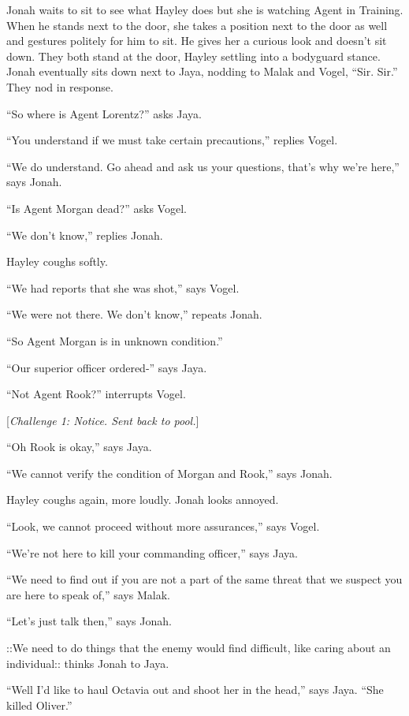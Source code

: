 Jonah waits to sit to see what Hayley does but she is watching Agent in Training.  When he stands next to the door, she takes a position next to the door as well and gestures politely for him to sit.  He gives her a curious look and doesn't sit down.  They both stand at the door, Hayley settling into a bodyguard stance.  Jonah eventually sits down next to Jaya, nodding to Malak and Vogel, ``Sir.  Sir.''  They nod in response.



``So where is Agent Lorentz?'' asks Jaya.

``You understand if we must take certain precautions,'' replies Vogel.

``We do understand.  Go ahead and ask us your questions, that's why we're here,'' says Jonah.

``Is Agent Morgan dead?'' asks Vogel.

``We don't know,'' replies Jonah.

Hayley coughs softly.

``We had reports that she was shot,'' says Vogel.

``We were not there.  We don't know,'' repeats Jonah.

``So Agent Morgan is in unknown condition.''

``Our superior officer ordered-'' says Jaya.

``Not Agent Rook?'' interrupts Vogel.

{[}\textit{Challenge 1: Notice.  Sent back to pool.}{]}

``Oh Rook is okay,'' says Jaya.

``We cannot verify the condition of Morgan and Rook,'' says Jonah.

Hayley coughs again, more loudly.  Jonah looks annoyed.

``Look, we cannot proceed without more assurances,'' says Vogel.

``We're not here to kill your commanding officer,'' says Jaya.

``We need to find out if you are not a part of the same threat that we suspect you are here to speak of,'' says Malak.

``Let's just talk then,'' says Jonah.

 {\color[RGB]{74,134,232}::We need to do things that the enemy would find difficult, like caring about an individual::}  thinks Jonah to Jaya.

``Well I'd like to haul Octavia out and shoot her in the head,'' says Jaya.  ``She killed Oliver.''

